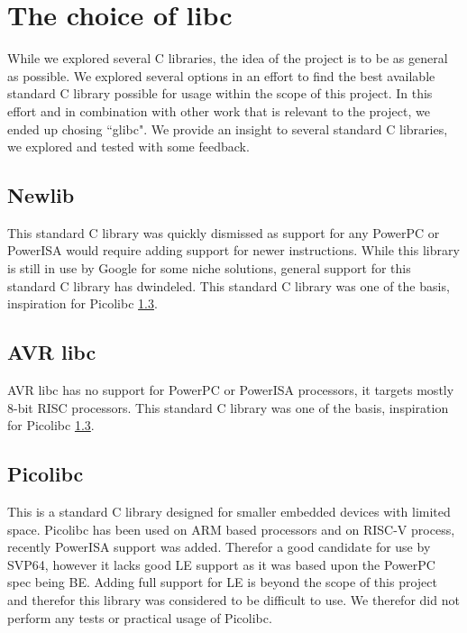 %

\chapter{The choice of libc}
\label{chap:libc}

While we explored several C libraries, the idea of the project is to be as general as possible.
We explored several options in an effort to find the best available standard C library possible for usage within the scope of this project.
In this effort and in combination with other work that is relevant to the project, we ended up chosing ``glibc".
We provide an insight to several standard C libraries, we explored and tested with some feedback.
\par

\section{Newlib}
\label{sec:newlib}

This standard C library was quickly dismissed as support for any PowerPC or PowerISA would require adding support for newer instructions.
While this library is still in use by Google for some niche solutions, general support for this standard C library has dwindeled.
This standard C library was one of the basis, inspiration for Picolibc \ref{content:picolibc}.
\par

\section{AVR libc}
\label{sec:avrlibc}

AVR libc has no support for PowerPC or PowerISA processors, it targets mostly 8-bit \acrshort{RISC} processors.
This standard C library was one of the basis, inspiration for Picolibc \ref{content:picolibc}.

\section{Picolibc}
\label{content:picolibc}

This is a standard C library designed for smaller embedded devices with limited space.
Picolibc has been used on \acrshort{ARM} based processors and on \acrshort{RISC-V} process, recently PowerISA support was added.
Therefor a good candidate for use by \acrshort{SVP64}, however it lacks good \acrfull{LE} support as it was based upon the PowerPC spec being \acrfull{BE}.
Adding full support for \acrfull{LE} is beyond the scope of this project and therefor this library was considered to be difficult to use.
We therefor did not perform any tests or practical usage of Picolibc.
\par

